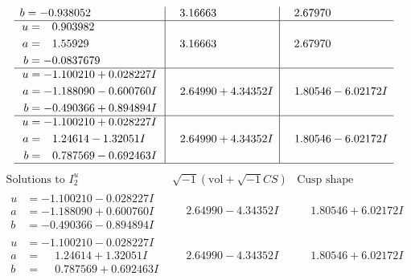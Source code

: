 \documentclass[1p]{elsarticle_modified}
\theoremstyle{definition}
\newcommand{\I}{\sqrt{-1}}
\begin{document}
$$\begin{array}{c|c|c}
\begin{aligned}
b &= -0.938052\phantom{ +0.000000I}\end{aligned}
 & \phantom{-}3.16663\phantom{ +0.000000I} & \phantom{-}2.67970\phantom{ +0.000000I} \\ \hline\begin{aligned}
u &= \phantom{-}0.903982\phantom{ +0.000000I} \\
a &= \phantom{-}1.55929\phantom{ +0.000000I} \\
b &= -0.0837679\phantom{ +0.000000I}\end{aligned}
 & \phantom{-}3.16663\phantom{ +0.000000I} & \phantom{-}2.67970\phantom{ +0.000000I} \\ \hline\begin{aligned}
u &= -1.100210 + 0.028227 I \\
a &= -1.188090 - 0.600760 I \\
b &= -0.490366 + 0.894894 I\end{aligned}
 & \phantom{-}2.64990 + 4.34352 I & \phantom{-}1.80546 - 6.02172 I \\ \hline\begin{aligned}
u &= -1.100210 + 0.028227 I \\
a &= \phantom{-}1.24614 - 1.32051 I \\
b &= \phantom{-}0.787569 - 0.692463 I\end{aligned}
 & \phantom{-}2.64990 + 4.34352 I & \phantom{-}1.80546 - 6.02172 I\\
 \hline 
 \end{array}$$\newpage$$\begin{array}{c|c|c}  
\text{Solutions to }I^u_{2}& \I (\text{vol} + \sqrt{-1}CS) & \text{Cusp shape}\\
 \hline 
\begin{aligned}
u &= -1.100210 - 0.028227 I \\
a &= -1.188090 + 0.600760 I \\
b &= -0.490366 - 0.894894 I\end{aligned}
 & \phantom{-}2.64990 - 4.34352 I & \phantom{-}1.80546 + 6.02172 I \\ \hline\begin{aligned}
u &= -1.100210 - 0.028227 I \\
a &= \phantom{-}1.24614 + 1.32051 I \\
b &= \phantom{-}0.787569 + 0.692463 I\end{aligned}
 & \phantom{-}2.64990 - 4.34352 I & \phantom{-}1.80546 + 6.02172 I \\ \hline\begin{aligned}

\end{aligned}
\end{array}$$
\end{document}
